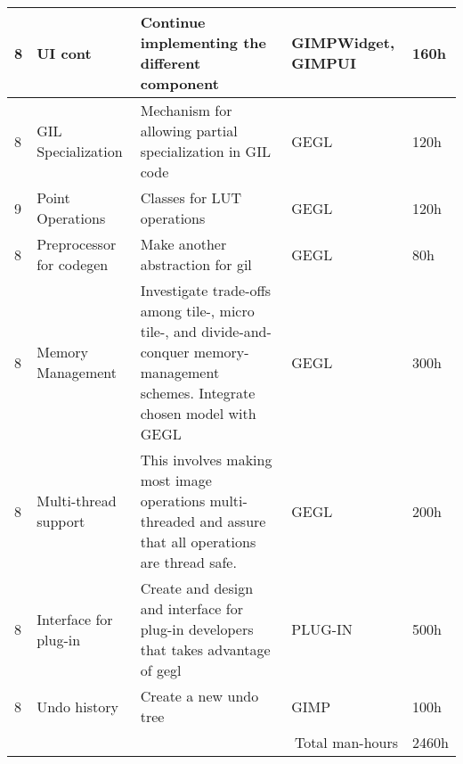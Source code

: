 \begin{flushleft}
\begin{tabular}{|l|p{3cm}|p{5cm}|p{2cm}|l|}
8 & UI cont & Continue implementing the different component & GIMPWidget, GIMPUI & 160h\\
\hline
8 & GIL Specialization & Mechanism for allowing partial specialization in GIL code & GEGL & 120h\\
\hline
9 & Point Operations & Classes for LUT operations & GEGL & 120h\\
\hline
8 & Preprocessor for codegen & Make another abstraction for gil & GEGL & 80h\\
\hline
8 & Memory Management & Investigate trade-offs among tile-, micro tile-, and divide-and-conquer memory-management schemes. Integrate chosen model with GEGL & GEGL & 300h\\
\hline
8 & Multi-thread support & This involves making most image operations multi-threaded and assure that all operations are thread safe. & GEGL & 200h\\  
\hline
8 & Interface for plug-in & Create and design and interface for plug-in developers that takes advantage of gegl & PLUG-IN & 500h\\
\hline
8 & Undo history & Create a new undo tree & GIMP & 100h\\
\hline
 
\multicolumn{4}{|r|}{Total man-hours} & 2460h\\
\hline
\end{tabular}
\end{flushleft}

	
